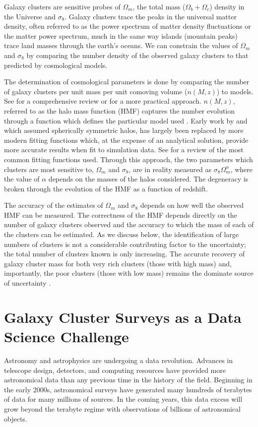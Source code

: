 Galaxy clusters are sensitive probes of $\Omega_m$, the total mass ($\Omega_b + \Omega_c$) density in the Universe and $\sigma_8$. Galaxy clusters trace the peaks in the universal matter density, often referred to as the power spectrum of matter density fluctuations or the matter power spectrum, much in the same way islands (mountain peaks) trace land masses through the earth's oceans. We can constrain the values of $\Omega_m$ and $\sigma_8$ by comparing the number density of the observed galaxy clusters to that predicted by cosmological models.

The determination of cosmological parameters is done by comparing the number of galaxy clusters per unit mass per unit comoving volume ($n(M,z)$) to models. See \cite{Allen2011} for a comprehensive review or \cite{Murray2013} for a more practical approach. $n(M,z)$, referred to as the halo mass function (HMF) captures the number evolution through a function which defines the particular model used . Early work by \cite{Press1974} and \cite{Bond1991} which assumed spherically symmetric halos, has largely been replaced by more modern fitting functions which, at the expense of an analytical solution, provide more accurate results when fit to simulation data. See \cite{Murray2013} for a review of the most common fitting functions used. Through this approach, the two parameters which clusters are most sensitive to, $\Omega_m$ and $\sigma_8$, are in reality measured as $\sigma_8\Omega_m^\alpha$, where the value of $\alpha$ depends on the masses of the halos considered. The degeneracy is broken through the evolution of the HMF as a function of redshift. 

The accuracy of the estimates of $\Omega_m$ and $\sigma_8$ depends on how well the observed HMF can be measured. The correctness of the HMF depends directly on the number of galaxy clusters observed and the accuracy to which the mass of each of the clusters can be estimated. As we discuss below, the identification of large numbers of clusters is not a considerable contributing factor to the uncertainty; the total number of clusters known is only increasing. The accurate recovery of galaxy cluster mass for both very rich clusters (those with high mass) and, importantly, the poor clusters (those with low mass) remains the dominate source of uncertainty .

\section{Galaxy Cluster Surveys as a Data Science Challenge}
Astronomy and astrophysics are undergoing a data revolution. Advances in telescope design, detectors, and computing resources have provided more astronomical data than any previous time in the history of the field. Beginning in the early 2000s, astronomical surveys have generated many hundreds of terabytes of data for many millions of sources. In the coming years, this data excess will grow beyond the terabyte regime with observations of billions of astronomical objects. 

